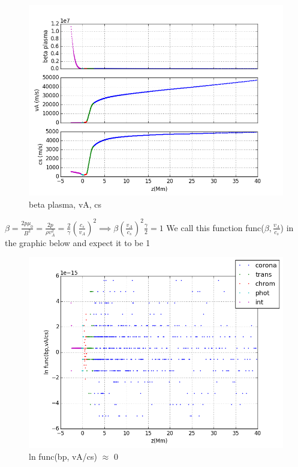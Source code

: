 \documentclass[10pt]{book}
\begin{document}
\begin{figure}[!ht]
 \centering
 \includegraphics[scale=0.5]{fromFile2.png}
 \caption{beta plasma, vA, cs}
\end{figure}

$\beta = \frac{2 p \mu_0}{B^2} = \frac{2 p}{\rho v_A^2} = \frac{2 }{\gamma}(\frac{c_s}{v_A})^2
\implies \beta (\frac{v_A}{c_s})^2 \frac{\gamma}{2} = 1 $
We call this function func($\beta, \frac{v_A}{c_s}$) in the graphic below and expect it to be 1


\newpage

\begin{figure}[!ht]
 \centering
 \includegraphics[scale=0.5]{fromFileLn3.png}
 \caption{ln func(bp, vA/cs) $\approx$ 0}
\end{figure}
\end{document}
